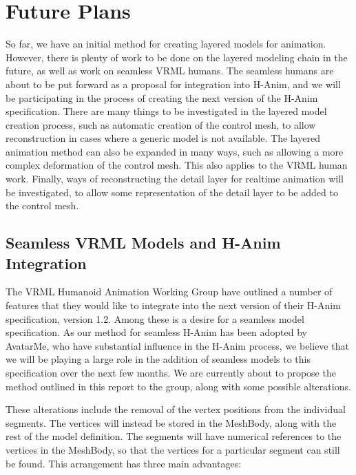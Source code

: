 \documentclass[10pt,oneside,fleqn,a4paper]{book}
\begin{document}
\chapter{\label{ch:future}Future Plans}
So far, we have an initial method for creating layered models for animation. However, there is plenty of work to be done on the layered modeling chain in the future, as well as work on seamless VRML humans. The seamless humans are about to be put forward as a proposal for integration into H-Anim, and we will be participating in the process of creating the next version of the H-Anim specification. There are many things to be investigated in the layered model creation process, such as automatic creation of the control mesh, to allow reconstruction in cases where a generic model is not available. The layered animation method can also be expanded in many ways, such as allowing a more complex deformation of the control mesh. This also applies to the VRML human work. Finally, ways of reconstructing the detail layer for realtime animation will be investigated, to allow some representation of the detail layer to be added to the control mesh.

\section{\label{sec:futureseamless}Seamless VRML Models and H-Anim Integration}
The VRML Humanoid Animation Working Group have outlined a number of features that they would like to integrate into the next version of their H-Anim specification, version 1.2. Among these is a desire for a seamless model specification. As our method for seamless H-Anim has been adopted by AvatarMe, who have substantial influence in the H-Anim process, we believe that we will be playing a large role in the addition of seamless models to this specification over the next few months. We are currently about to propose the method outlined in this report to the group, along with some possible alterations.

These alterations include the removal of the vertex positions from the individual segments. The vertices will instead be stored in the MeshBody, along with the rest of the model definition. The segments will have numerical references to the vertices in the MeshBody, so that the vertices for a particular segment can still be found. This arrangement has three main advantages:
\end{document}
